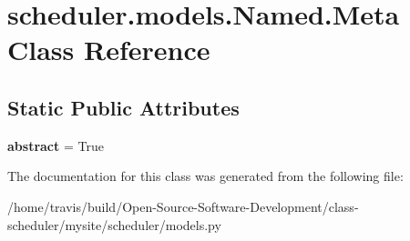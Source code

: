 \hypertarget{classscheduler_1_1models_1_1_named_1_1_meta}{\section{scheduler.\-models.\-Named.\-Meta Class Reference}
\label{classscheduler_1_1models_1_1_named_1_1_meta}
}
\subsection*{Static Public Attributes}
\begin{DoxyCompactItemize}
\item 
\hypertarget{classscheduler_1_1models_1_1_named_1_1_meta_a15a08f213947349b70c40da1a57d1e3c}{{\bfseries abstract} = True}\label{classscheduler_1_1models_1_1_named_1_1_meta_a15a08f213947349b70c40da1a57d1e3c}

\end{DoxyCompactItemize}


The documentation for this class was generated from the following file\-:\begin{DoxyCompactItemize}
\item 
/home/travis/build/\-Open-\/\-Source-\/\-Software-\/\-Development/class-\/scheduler/mysite/scheduler/models.\-py\end{DoxyCompactItemize}
